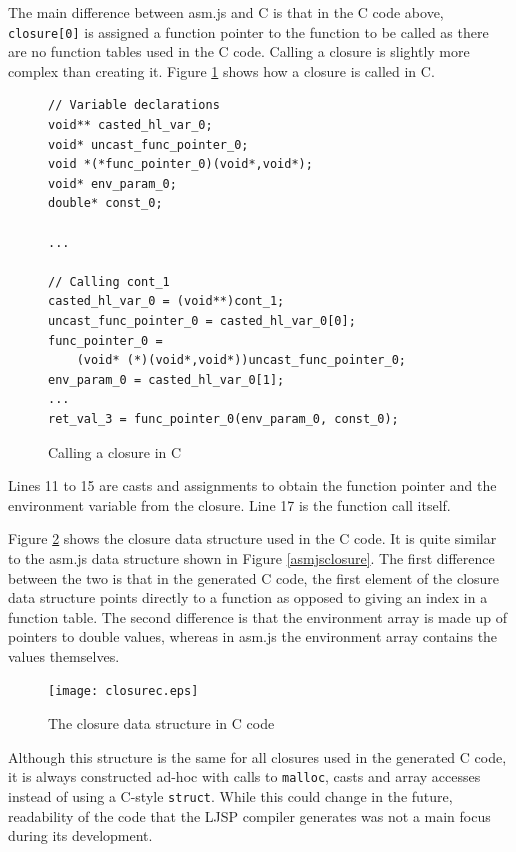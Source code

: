 \documentclass[11pt]{report}
\begin{document}
The main difference between asm.js and C is that in the C code above, \texttt{closure[0]} is assigned a function pointer to the function to be called as there are no function tables used in the C code. Calling a closure is slightly more complex than creating it. Figure \ref{icmm3} shows how a closure is called in C.

\begin{figure}[ht]
\begin{lstlisting}
// Variable declarations
void** casted_hl_var_0;
void* uncast_func_pointer_0;
void *(*func_pointer_0)(void*,void*);
void* env_param_0;
double* const_0;

...

// Calling cont_1
casted_hl_var_0 = (void**)cont_1;
uncast_func_pointer_0 = casted_hl_var_0[0];
func_pointer_0 = 
    (void* (*)(void*,void*))uncast_func_pointer_0;
env_param_0 = casted_hl_var_0[1];
...
ret_val_3 = func_pointer_0(env_param_0, const_0);
\end{lstlisting}
\caption{Calling a closure in C}
\label{icmm3}
\end{figure}

Lines 11 to 15 are casts and assignments to obtain the function pointer and the environment variable from the closure. Line 17 is the function call itself.

Figure \ref{cclosure} shows the closure data structure used in the C code. It is quite similar to the asm.js data structure shown in Figure \ref{asmjsclosure}. The first difference between the two is that in the generated C code, the first element of the closure data structure points directly to a function as opposed to giving an index in a function table. The second difference is that the environment array is made up of pointers to double values, whereas in asm.js the environment array contains the values themselves.

\begin{figure}[ht]
\begin{center}
\texttt{[image: closurec.eps]}
\end{center}
\caption{The closure data structure in C code}
\label{cclosure}
\end{figure}

Although this structure is the same for all closures used in the generated C code, it is always constructed ad-hoc with calls to \texttt{malloc}, casts and array accesses instead of using a C-style \texttt{struct}. While this could change in the future, readability of the code that the LJSP compiler generates was not a main focus during its development.
\end{document}
